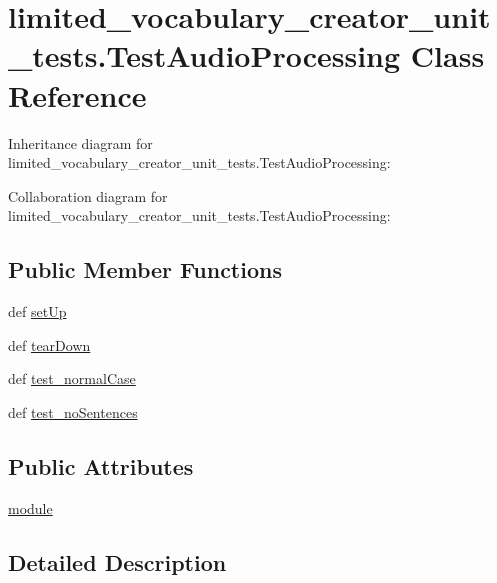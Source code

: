 \hypertarget{classlimited__vocabulary__creator__unit__tests_1_1TestAudioProcessing}{\section{limited\-\_\-vocabulary\-\_\-creator\-\_\-unit\-\_\-tests.\-Test\-Audio\-Processing Class Reference}
\label{classlimited__vocabulary__creator__unit__tests_1_1TestAudioProcessing}
}


Inheritance diagram for limited\-\_\-vocabulary\-\_\-creator\-\_\-unit\-\_\-tests.\-Test\-Audio\-Processing\-:


Collaboration diagram for limited\-\_\-vocabulary\-\_\-creator\-\_\-unit\-\_\-tests.\-Test\-Audio\-Processing\-:
\subsection*{Public Member Functions}
\begin{DoxyCompactItemize}
\item 
def \hyperlink{classlimited__vocabulary__creator__unit__tests_1_1TestAudioProcessing_a7d117106303f6b37caa92222f38a547b}{set\-Up}
\item 
def \hyperlink{classlimited__vocabulary__creator__unit__tests_1_1TestAudioProcessing_ac0e1025eba3f01c3ea857bfaa8c67ee5}{tear\-Down}
\item 
def \hyperlink{classlimited__vocabulary__creator__unit__tests_1_1TestAudioProcessing_aa02d8e6e8cc2eb4944d23065b1f61a29}{test\-\_\-normal\-Case}
\item 
def \hyperlink{classlimited__vocabulary__creator__unit__tests_1_1TestAudioProcessing_a558b72f2e42b4ded6b90ca51ab64f925}{test\-\_\-no\-Sentences}
\end{DoxyCompactItemize}
\subsection*{Public Attributes}
\begin{DoxyCompactItemize}
\item 
\hyperlink{classlimited__vocabulary__creator__unit__tests_1_1TestAudioProcessing_a3a245e4b4de98cee967b701ada399354}{module}
\end{DoxyCompactItemize}


\subsection{Detailed Description}


